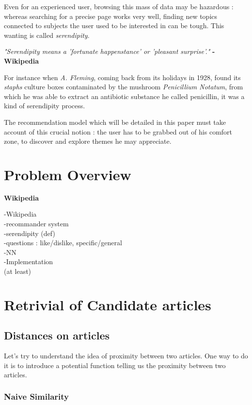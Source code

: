 \documentclass[11pt]{article}
\theoremstyle{plain}
\theoremstyle{definition}
\theoremstyle{remark}
\begin{document}
Even for an experienced user, browsing this mass of data may be hazardous : whereas searching for a precise page works very well, finding new topics connected to subjects the user used to be interested in can be tough. This wanting is called \textit{serendipity}. 

\begin{center}
\textit{"Serendipity means a 'fortunate happenstance' or 'pleasant surprise'." } \textbf{- Wikipedia}
\end{center}

For instance when \textit{A. Fleming}, coming back from its holidays in 1928, found its \textit{staphs} culture boxes contaminated by the mushroom \textit{Penicillium Notatum}, from which he was able to extract an antibiotic substance he called penicillin, it was a kind of serendipity process.

The recommendation model which will be detailed in this paper must take account of this crucial notion : the user has to be grabbed out of his comfort zone, to discover and explore themes he may appreciate.

\section{Problem Overview}

\textbf{Wikipedia}


-Wikipedia\\
-recommander system\\
-serendipity (def)\\
-questions : like/dislike, specific/general\\
-NN\\
-Implementation\\
(at least)

\section{Retrivial of Candidate articles}


\subsection{Distances on articles}

Let's try to understand the idea of proximity between two articles. One way to do it is to introduce a potential function telling us the proximity between two articles.

\subsubsection{Naive Similarity}
\end{document}
